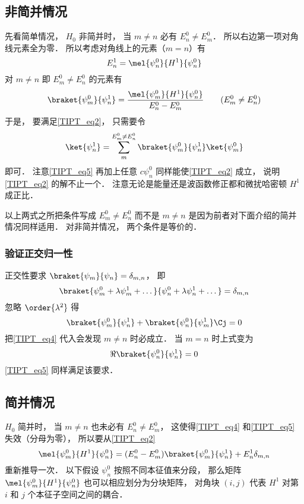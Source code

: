 \subsection{非简并情况}
先看简单情况， $H_0$ 非简并时， 当 $m\ne n$ 必有 $E_n^0 \ne E_m^0$． 所以右边第一项对角线元素全为零． 所以考虑对角线上的元素（$m = n$）有
\begin{equation}\label{TIPT_eq6}
E_n^1 = \mel{\psi_n^0}{H^1}{\psi_n^0}
\end{equation}
对 $m \ne n$ 即 $E_m^0 \ne E_n^0$ 的元素有
\begin{equation}\label{TIPT_eq4}
\braket{\psi_m^0}{\psi_n^1} = \frac{\mel{\psi_m^0}{H^1}{\psi_n^0}}{E_n^0 - E_m^0} \qquad (E_m^0 \ne E_n^0)
\end{equation}
于是， 要满足\autoref{TIPT_eq2}， 只需要令
\begin{equation}\label{TIPT_eq5}
\ket{\psi_n^1} = \sum_m^{E_m^0 \ne E_n^0} \braket{\psi_m^0}{\psi_n^1} \ket{\psi_m^0}
\end{equation}
即可． 注意\autoref{TIPT_eq5} 再加上任意 $c \psi_n^0$ 同样能使\autoref{TIPT_eq2} 成立， 说明\autoref{TIPT_eq2} 的解不止一个． 注意无论是能量还是波函数修正都和微扰哈密顿 $H^1$ 成正比．

以上两式之所把条件写成 $E_m^0 \ne E_n^0$ 而不是 $m \ne n$ 是因为前者对下面介绍的简并情况同样适用． 对非简并情况， 两个条件是等价的．

\subsubsection{验证正交归一性}
正交性要求 $\braket{\psi_m}{\psi_n} = \delta_{m,n}$， 即
\begin{equation}\label{TIPT_eq7}
\braket{\psi_m^0 + \lambda \psi_m^1 + \dots}{\psi_n^0 + \lambda \psi_n^1 + \dots} = \delta_{m,n}
\end{equation}
忽略 $\order{\lambda^2}$ 得
\begin{equation}\label{TIPT_eq8}
\braket{\psi_m^0}{\psi_n^1} + \braket{\psi_n^0}{\psi_m^1}\Cj = 0
\end{equation}
把\autoref{TIPT_eq4} 代入会发现 $m \ne n$ 时必成立． 当 $m = n$ 时上式变为
\begin{equation}
\Re{\braket{\psi_n^0}{\psi_n^1}} = 0
\end{equation}
\autoref{TIPT_eq5} 同样满足该要求．

\subsection{简并情况}
$H_0$ 简并时， 当 $m\ne n$ 也未必有 $E_n^0 \ne E_m^0$， 这使得\autoref{TIPT_eq4} 和\autoref{TIPT_eq5} 失效（分母为零）， 所以要从\autoref{TIPT_eq2}
\begin{equation}
\mel{\psi_m^0}{H^1}{\psi_n^0} = (E_n^0 - E_m^0) \braket{\psi_m^0}{\psi_n^1} + E_n^1 \delta_{m,n}
\end{equation}
重新推导一次． 以下假设 $\psi_n^0$ 按照不同本征值来分段， 那么矩阵 $\mel{\psi_m^0}{H^1}{\psi_n^0}$ 也可以相应划分为分块矩阵， 对角块 $(i,j)$ 代表 $H^1$ 对第 $i$ 和 $j$ 个本征子空间之间的耦合．

